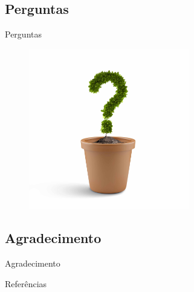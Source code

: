 \subsection{Perguntas}
\begin{frame}{Perguntas}
	\begin{figure}
		\centering
		\includegraphics[width=7cm,keepaspectratio=true]{img/ask.jpg}
	\end{figure}
\end{frame}

\subsection{Agradecimento}
\begin{frame}{Agradecimento}
		
	\begin{center}
		\centering
			 
		\hspace*{-1cm}
	\end{center}
	\centering
	
\end{frame}


\begin{frame}[allowframebreaks]{Referências}
	
\end{frame}


